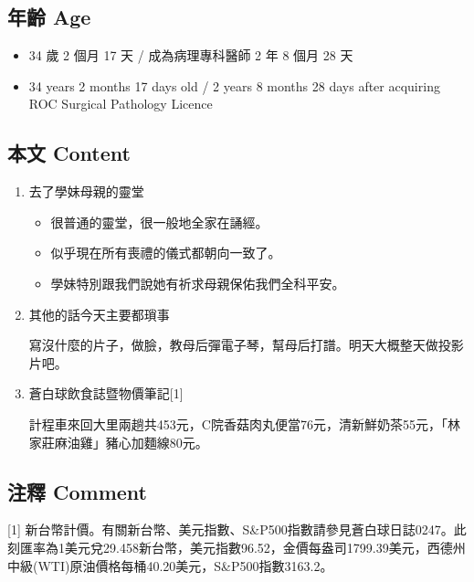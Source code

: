 \documentclass[a5paper, 11pt
]{book}
\providecommand{\tightlist}{%
  \setlength{\itemsep}{0pt}\setlength{\parskip}{0pt}}
\begin{document}
\hypertarget{ux5e74ux9f61-age-39}{%
\subsection{年齡 Age}\label{ux5e74ux9f61-age-39}}

\begin{itemize}
\tightlist
\item
  34 歲 2 個月 17 天 / 成為病理專科醫師 2 年 8 個月 28 天
\item
  34 years 2 months 17 days old / 2 years 8 months 28 days after
  acquiring ROC Surgical Pathology Licence
\end{itemize}

\hypertarget{ux672cux6587-content-39}{%
\subsection{本文 Content}\label{ux672cux6587-content-39}}

\begin{enumerate}
\def\labelenumi{\arabic{enumi}.}
\item
  去了學妹母親的靈堂

  \begin{itemize}
  \tightlist
  \item
    很普通的靈堂，很一般地全家在誦經。
  \item
    似乎現在所有喪禮的儀式都朝向一致了。
  \item
    學妹特別跟我們說她有祈求母親保佑我們全科平安。
  \end{itemize}
\item
  其他的話今天主要都瑣事

  寫沒什麼的片子，做臉，教母后彈電子琴，幫母后打譜。明天大概整天做投影片吧。
\item
  蒼白球飲食誌暨物價筆記{[}1{]}

  計程車來回大里兩趟共453元，C院香菇肉丸便當76元，清新鮮奶茶55元，「林家莊麻油雞」豬心加麵線80元。
\end{enumerate}

\hypertarget{ux6ce8ux91cb-comment-39}{%
\subsection{注釋 Comment}\label{ux6ce8ux91cb-comment-39}}

{[}1{]}
新台幣計價。有關新台幣、美元指數、S\&P500指數請參見蒼白球日誌0247。此刻匯率為1美元兌29.458新台幣，美元指數96.52，金價每盎司1799.39美元，西德州中級(WTI)原油價格每桶40.20美元，S\&P500指數3163.2。
\end{document}
